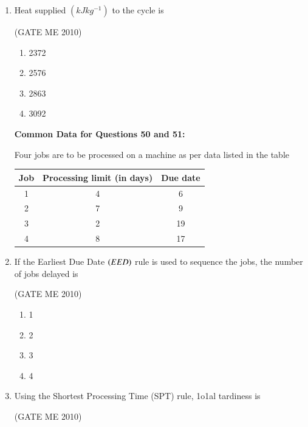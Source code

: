 \documentclass[journal,12pt,onecolumn]{IEEEtran}
\theoremstyle{remark}
\begin{document}
\begin{enumerate}
\item Heat supplied $(kJkg^{-1})$ to the cycle is

\hfill{(GATE  ME 2010)}\\


\begin{multicols}{4}
\begin{enumerate}
\item 2372
\item 2576
\item 2863
\item 3092
\end{enumerate}
\end{multicols}



\textbf{Common Data for Questions 50 and 51:}

Four jobs are to be processed on a machine as per data listed in the table
\begin{table}[h!]
  \centering
  \begin{tabular}{|c|c|c|}
    \hline
    \textbf{Job} & \textbf{Processing limit (in days)} & \textbf{Due date} \\
    \hline
    1 & 4 & 6 \\
    \hline
    2 & 7 & 9 \\
    \hline
    3 & 2 & 19 \\
    \hline
    4 & 8 & 17 \\
    \hline
  \end{tabular}
  \label{tab:jobs}
\end{table}

\item If the Earliest Due Date $\left(EED\right)$ rule is used to sequence the jobs, the number of jobs delayed is


\hfill{(GATE  ME 2010)}\\


\begin{multicols}{4}
\begin{enumerate}
\item 1
\item 2
\item 3
\item 4
\end{enumerate}
\end{multicols}


\item Using the Shortest Processing Time (SPT) rule, 1o1al tardiness is

\hfill{(GATE  ME 2010)}\\


\end{enumerate}
\end{document}
